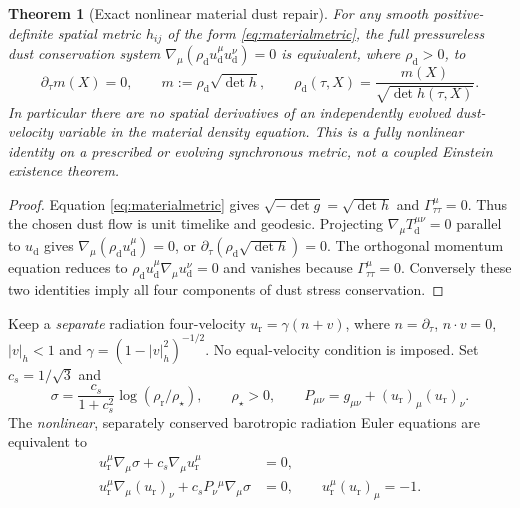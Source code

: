 \documentclass[11pt,a4paper]{article}
\newtheorem{theorem}{Theorem}
\begin{document}
\begin{theorem}[Exact nonlinear material dust repair]
\label{thm:material}
For any smooth positive-definite spatial metric
$h_{ij}$ of the form \eqref{eq:materialmetric},
the full pressureless dust conservation system
$\nabla_\mu(\rho_{\mathrm d}u_{\mathrm d}^\mu
u_{\mathrm d}^\nu)=0$ is equivalent, where
$\rho_{\mathrm d}>0$, to
\begin{equation}\label{eq:materialmass}
\boxed{\quad
\partial_\tau m(X)=0,\qquad
m:=\rho_{\mathrm d}\sqrt{\det h},\qquad
\rho_{\mathrm d}(\tau,X)
=\frac{m(X)}{\sqrt{\det h(\tau,X)}}.
\quad}
\end{equation}
In particular there are \emph{no spatial derivatives}
of an independently evolved dust-velocity variable
in the material density equation. This is a fully
nonlinear identity on a prescribed or evolving
synchronous metric, not a coupled Einstein existence theorem.
\end{theorem}
\begin{proof}
Equation \eqref{eq:materialmetric} gives
$\sqrt{-\det g}=\sqrt{\det h}$ and
$\Gamma^\mu_{\tau\tau}=0$.
Thus the chosen dust flow is unit timelike
and geodesic. Projecting
$\nabla_\mu T_{\mathrm d}^{\mu\nu}=0$
parallel to $u_{\mathrm d}$ gives
$\nabla_\mu(\rho_{\mathrm d}u_{\mathrm d}^\mu)=0$,
or
$\partial_\tau(\rho_{\mathrm d}\sqrt{\det h})=0$.
The orthogonal momentum equation reduces
to $\rho_{\mathrm d}
u_{\mathrm d}^\mu\nabla_\mu u_{\mathrm d}^\nu=0$
and vanishes because
$\Gamma^\mu_{\tau\tau}=0$.
Conversely these two identities imply all
four components of dust stress conservation.
\end{proof}

Keep a \emph{separate} radiation four-velocity
$u_{\mathrm r}=\gamma(n+v)$, where
$n=\partial_\tau$, $n\cdot v=0$,
$|v|_h<1$ and
$\gamma=(1-|v|_h^2)^{-1/2}$.
No equal-velocity condition is imposed.
Set $c_s=1/\sqrt3$ and
\[
\sigma=\frac{c_s}{1+c_s^2}
\log(\rho_{\mathrm r}/\rho_\star),
\qquad \rho_\star>0,\qquad
P_{\mu\nu}=g_{\mu\nu}
+(u_{\mathrm r})_\mu(u_{\mathrm r})_\nu .
\]
The \emph{nonlinear}, separately conserved
barotropic radiation Euler equations are
equivalent to
\begin{equation}\label{eq:covrad}
\begin{aligned}
u_{\mathrm r}^\mu\nabla_\mu\sigma
+c_s\nabla_\mu u_{\mathrm r}^\mu&=0,\\
u_{\mathrm r}^\mu\nabla_\mu(u_{\mathrm r})_\nu
+c_sP_\nu{}^\mu\nabla_\mu\sigma&=0,
\qquad u_{\mathrm r}^\mu(u_{\mathrm r})_\mu=-1.
\end{aligned}
\end{equation}
\end{document}

